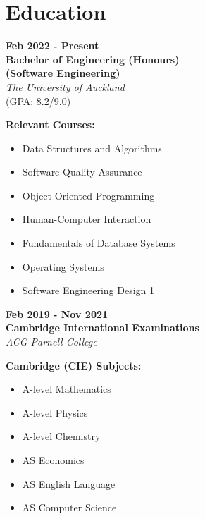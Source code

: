 \documentclass[a4paper,12pt]{article}
\newcommand{\sectionicon}[2]{%
    \section[#1]{\faIcon{#2}\quad #1}%
}
\begin{document}

\sectionicon{Education}{graduation-cap}

\begin{minipage}[t]{0.45\textwidth}
\textbf{Feb 2022 - Present} \\
\textbf{Bachelor of Engineering (Honours) \\ (Software Engineering)} \\
\textit{The University of Auckland} \\
(GPA: 8.2/9.0)
\end{minipage}
\hfill
\begin{minipage}[t]{0.45\textwidth}
\textbf{Relevant Courses:}
\begin{itemize}
    \item Data Structures and Algorithms
    \item Software Quality Assurance
    \item Object-Oriented Programming
    \item Human-Computer Interaction
    \item Fundamentals of Database Systems
    \item Operating Systems
    \item Software Engineering Design 1
\end{itemize}
\end{minipage}

\vspace{0.5cm} %

\begin{minipage}[t]{0.45\textwidth}
\textbf{Feb 2019 - Nov 2021} \\
\textbf{Cambridge International Examinations} \\
\textit{ACG Parnell College} \\
\end{minipage}
\hfill
\begin{minipage}[t]{0.45\textwidth}
\textbf{Cambridge (CIE) Subjects:}
\begin{itemize}
    \item A-level Mathematics
    \item A-level Physics
    \item A-level Chemistry
    \item AS Economics
    \item AS English Language
    \item AS Computer Science
\end{itemize}
\end{minipage}
\end{document}
